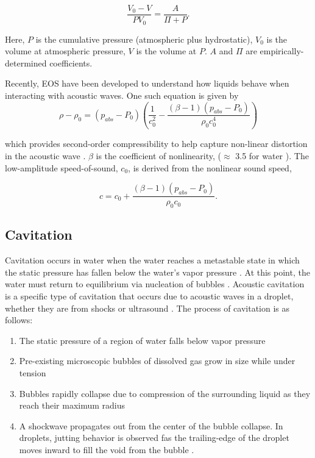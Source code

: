 \documentclass{UCF_ETD}
\begin{document}
\begin{equation}
    \frac{V_{0} - V}{PV_{0}} = \frac{A}{\Pi + P}.
    \label{eq:tait}
\end{equation}

Here, $P$ is the cumulative pressure (atmospheric plus hydrostatic), $V_{0}$ is the volume at atmospheric pressure, $V$ is the volume at $P$. $A$ and $\Pi$ are empirically-determined coefficients. 

Recently, EOS have been developed to understand how liquids behave when interacting with acoustic waves. One such equation is given by
\begin{equation}
    \rho - \rho_{0} = \left( p_{abs} - P_{0} \right) \left( \frac{1}{c_{0}^{2}} - \frac{\left( \beta - 1 \right) \left( p_{abs} - P_{0} \right) }{\rho_{0} c_{0}^{4}} \right)
    \label{eq:hamiltonEOS}
\end{equation}

which provides second-order compressibility to help capture non-linear distortion in the acoustic wave \cite{hamilton2008nonlinear}. $\beta$ is the coefficient of nonlinearity, ($\approx$ 3.5 for water \cite{Esplin2016}). The low-amplitude speed-of-sound, $c_{0}$, is derived from the nonlinear sound speed,

\begin{equation}
    c = c_{0} + \frac{\left( \beta -1 \right) \left( p_{abs} - P_{0} \right)}{\rho_{0}c_{0}}.
    \label{eq:nonlinearsound}
\end{equation}



\subsection{Cavitation}
Cavitation occurs in water when the water reaches a metastable state in which the static pressure has fallen below the water's vapor pressure \cite{CAUPIN20061000}. At this point, the water must return to equilibrium via nucleation of bubbles \cite{CAUPIN20061000}. Acoustic cavitation is a specific type of cavitation that occurs due to acoustic waves in a droplet, whether they are from shocks \cite{kedrinskii2007shock} or ultrasound \cite{Yasui2018}. The process of cavitation is as follows:

\begin{enumerate}
    \item The static pressure of a region of water falls below vapor pressure
    \item Pre-existing microscopic bubbles of dissolved gas grow in size \cite{Plesset1977} while under tension
    \item Bubbles rapidly collapse due to compression of the surrounding liquid as they reach their maximum radius
    \item A shockwave propagates out from the center of the bubble collapse. In droplets, jutting behavior is observed fas the trailing-edge of the droplet moves inward to fill the void from the bubble \cite{REESE2024104822,Fan2024}.
\end{enumerate}
\end{document}
